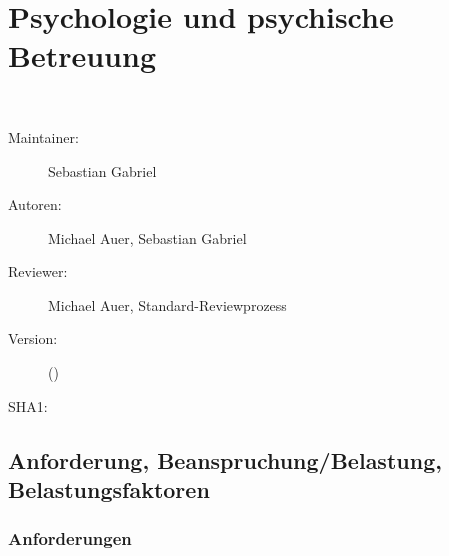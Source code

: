 ﻿%
\chapter
[\CO{[PSI]} Psychologie und psychische Betreuung]
{Psychologie und psychische Betreuung}
\label{chp:PSY}

\ChapterIntro
{%
~~~
}
{%
\begin{description}
  \item[Maintainer:] Sebastian Gabriel
  \item[Autoren:] Michael Auer, Sebastian Gabriel
  \item[Reviewer:] Michael Auer, Standard-Reviewprozess
  \item[Version:] {\DocVersion} ({\DocVersionInfo})
  \item[SHA1:] {\DocGitCommit}
\end{description}

{\TxTeilkapitelAASS}
}



\clearpage
\section{Anforderung, Beanspruchung/Belastung, Belastungsfaktoren}

\subsection{Anforderungen} 

